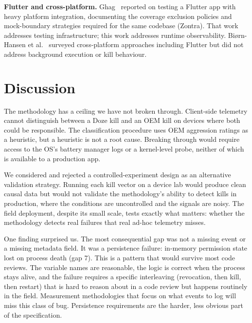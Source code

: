 \documentclass[10pt,journal,compsoc]{IEEEtran}
\begin{document}
\textbf{Flutter and cross-platform.}
Ghag~\cite{ghag2026testing} reported on testing a Flutter app with
heavy platform integration, documenting the coverage exclusion policies
and mock-boundary strategies required for the same codebase (Zontra).
That work addresses testing infrastructure; this work addresses runtime
observability. Bi{\o}rn-Hansen et al.~\cite{biorn2020flutter} surveyed
cross-platform approaches including Flutter but did not address
background execution or kill behaviour.


\section{Discussion}
\label{sec:discussion}

The methodology has a ceiling we have not broken through. Client-side
telemetry cannot distinguish between a Doze kill and an OEM kill on
devices where both could be responsible. The classification procedure
uses OEM aggression ratings as a heuristic, but a heuristic is not a
root cause. Breaking through would require access to the OS's battery
manager logs or a kernel-level probe, neither of which is available to a
production app.

We considered and rejected a controlled-experiment design as an
alternative validation strategy. Running each kill vector on a device
lab would produce clean causal data but would not validate the
methodology's ability to detect kills in production, where the
conditions are uncontrolled and the signals are noisy. The field
deployment, despite its small scale, tests exactly what matters: whether
the methodology detects real failures that real ad-hoc telemetry misses.

One finding surprised us. The most consequential gap was not a missing
event or a missing metadata field. It was a persistence failure:
in-memory permission state lost on process death (gap 7). This is a
pattern that would survive most code reviews. The variable names are
reasonable, the logic is correct when the process stays alive, and the
failure requires a specific interleaving (revocation, then kill, then
restart) that is hard to reason about in a code review but happens
routinely in the field. Measurement methodologies that focus on what
events to log will miss this class of bug. Persistence requirements are
the harder, less obvious part of the specification.
\end{document}
